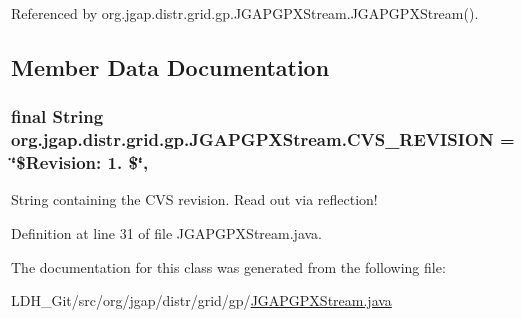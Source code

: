 Referenced by org.\-jgap.\-distr.\-grid.\-gp.\-J\-G\-A\-P\-G\-P\-X\-Stream.\-J\-G\-A\-P\-G\-P\-X\-Stream().



\subsection{Member Data Documentation}
\hypertarget{classorg_1_1jgap_1_1distr_1_1grid_1_1gp_1_1_j_g_a_p_g_p_x_stream_a472304a65be557daf488f767815c10b2}{
\subsubsection[{C\-V\-S\-\_\-\-R\-E\-V\-I\-S\-I\-O\-N}]{\setlength{\rightskip}{0pt plus 5cm}final String org.\-jgap.\-distr.\-grid.\-gp.\-J\-G\-A\-P\-G\-P\-X\-Stream.\-C\-V\-S\-\_\-\-R\-E\-V\-I\-S\-I\-O\-N = \char`\"{}\$Revision\-: 1. \$\char`\"{}\hspace{0.3cm}{\ttfamily [static]}, {\ttfamily [private]}}}\label{classorg_1_1jgap_1_1distr_1_1grid_1_1gp_1_1_j_g_a_p_g_p_x_stream_a472304a65be557daf488f767815c10b2}
String containing the C\-V\-S revision. Read out via reflection! 

Definition at line 31 of file J\-G\-A\-P\-G\-P\-X\-Stream.\-java.



The documentation for this class was generated from the following file\-:\begin{DoxyCompactItemize}
\item 
L\-D\-H\-\_\-\-Git/src/org/jgap/distr/grid/gp/\hyperlink{_j_g_a_p_g_p_x_stream_8java}{J\-G\-A\-P\-G\-P\-X\-Stream.\-java}\end{DoxyCompactItemize}
